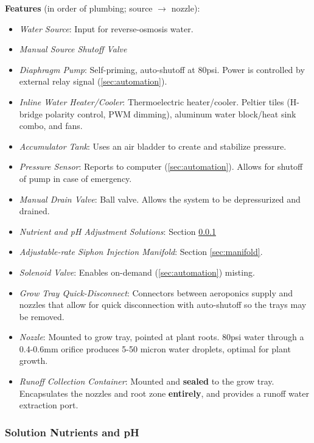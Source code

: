 \documentclass{../tex/report}
\begin{document}
\textbf{Features} (in order of plumbing; source $\to$ nozzle):
\begin{itemize}
    \item \textit{Water Source}: Input for reverse-osmosis water.
    \item \textit{Manual Source Shutoff Valve}
    \item \textit{Diaphragm Pump}: Self-priming, auto-shutoff at 80psi. Power is controlled by external relay signal (\ref{sec:automation}).
    \item \textit{Inline Water Heater/Cooler}: Thermoelectric heater/cooler. Peltier tiles (H-bridge polarity control, PWM dimming), aluminum water block/heat sink combo, and fans.
    \item \textit{Accumulator Tank}: Uses an air bladder to create and stabilize pressure.
    \item \textit{Pressure Sensor}: Reports to computer (\ref{sec:automation}). Allows for shutoff of pump in case of emergency.
    \item \textit{Manual Drain Valve}: Ball valve. Allows the system to be depressurized and drained.
    \item \textit{Nutrient and pH Adjustment Solutions}: Section \ref{sec:nutrientsph}
    \item \textit{Adjustable-rate Siphon Injection Manifold}: Section \ref{sec:manifold}.
    \item \textit{Solenoid Valve}: Enables on-demand (\ref{sec:automation}) misting.
    \item \textit{Grow Tray Quick-Disconnect}: Connectors between aeroponics supply and nozzles that allow for quick disconnection with auto-shutoff so the trays may be removed.
    \item \textit{Nozzle}: Mounted to grow tray, pointed at plant roots. 80psi water through a 0.4-0.6mm orifice produces 5-50 micron water droplets, optimal for plant growth. %
    \item \textit{Runoff Collection Container}: Mounted and \textbf{sealed} to the grow tray. Encapsulates the nozzles and root zone \textbf{entirely}, and provides a runoff water extraction port.
\end{itemize}

\vspace{.5cm}

\subsubsection{Solution Nutrients and pH}
\label{sec:nutrientsph}
\end{document}

